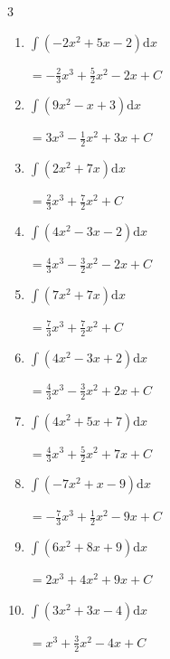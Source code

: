 \begin{multicols}{3}
\begin{enumerate}
\columnbreak %

  \item $\displaystyle \int \left( -2x^{2}+5x-2 \right) \mathrm{d}x$

        $\displaystyle =-\frac{2}{3}x^{3}+\frac{5}{2}x^{2}-2x+ C$

  \item $\displaystyle \int \left( 9x^{2}-x+3 \right) \mathrm{d}x$

        $\displaystyle =3x^{3}-\frac{1}{2}x^{2}+3x+ C$

  \item $\displaystyle \int \left( 2x^{2}+7x \right) \mathrm{d}x$

        $\displaystyle =\frac{2}{3}x^{3}+\frac{7}{2}x^{2}+ C$

  \item $\displaystyle \int \left( 4x^{2}-3x-2 \right) \mathrm{d}x$

        $\displaystyle =\frac{4}{3}x^{3}-\frac{3}{2}x^{2}-2x+ C$

  \item $\displaystyle \int \left( 7x^{2}+7x \right) \mathrm{d}x$

        $\displaystyle =\frac{7}{3}x^{3}+\frac{7}{2}x^{2}+ C$

  \item $\displaystyle \int \left( 4x^{2}-3x+2 \right) \mathrm{d}x$

        $\displaystyle =\frac{4}{3}x^{3}-\frac{3}{2}x^{2}+2x+ C$

  \item $\displaystyle \int \left( 4x^{2}+5x+7 \right) \mathrm{d}x$

        $\displaystyle =\frac{4}{3}x^{3}+\frac{5}{2}x^{2}+7x+ C$

  \item $\displaystyle \int \left( -7x^{2}+x-9 \right) \mathrm{d}x$

        $\displaystyle =-\frac{7}{3}x^{3}+\frac{1}{2}x^{2}-9x+ C$

  \item $\displaystyle \int \left( 6x^{2}+8x+9 \right) \mathrm{d}x$

        $\displaystyle =2x^{3}+4x^{2}+9x+ C$

  \item $\displaystyle \int \left( 3x^{2}+3x-4 \right) \mathrm{d}x$

        $\displaystyle =x^{3}+\frac{3}{2}x^{2}-4x+ C$

\columnbreak %


\end{enumerate}
\end{multicols}
